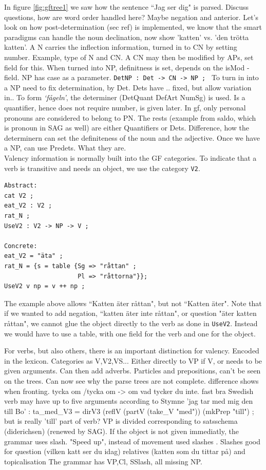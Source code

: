 \documentclass{report}
\begin{document}
In figure \ref{fig:gftree1} we saw how the sentence ``Jag ser dig" is parsed.
Discuss questions, how are word order handled here? Maybe negation and anterior.
Let's look on how post-determination (sec ref) is implemented, we know that the
smart paradigms can handle the noun declination, now show 'katten' vs. 'den trötta katten'.
A N carries the inflection information, turned in to CN by setting number. Example, type
of N and CN. A CN may then be modified by APs, set field for this. When turned into NP, 
definitness is set, depends on the isMod -field. NP has case as a parameter.
\verb|DetNP : Det -> CN -> NP ; |
To turn in into a NP need to fix determination, by Det. Dets have .. fixed,
but allow variation in.. 
To form \emph{`fågeln'}, the determiner (DetQuant DefArt NumSg) is used.
Is a quantifier, hence does not require number, is given later.
In gf, only personal pronouns are considered to belong to PN. The rests (example from
saldo, which is pronoun in SAG as well) are either Quantifiers or Dets.
Difference, how the determinern can set the definiteness of the noun and
the adjective.
Once we have a NP, can use Predets. What they are.\\

Valency information is normally built into the GF categories. To indicate that
a verb is transitive and needs an object, we use the category \verb_V2_.
\begin{verbatim}
Abstract:
cat V2 ; 
eat_V2 : V2 ;
rat_N ;
UseV2 : V2 -> NP -> V ;

Concrete:
eat_V2 = "äta" ;
rat_N = {s = table {Sg => "råttan" ;
                    Pl => "råttorna"}};
UseV2 v np = v ++ np ;
\end{verbatim}

The example above allows ``Katten äter råttan", but not ``Katten äter".
Note that if we wanted to add negation, ``katten äter inte råttan", or question
"äter katten råttan", we cannot glue the object directly to the verb as done in
\verb-UseV2-. Instead we would have to use a table, with one field for the verb
and one for the object. 


For verbs, but also others, there is an important distinction for valency.
Encoded in the lexicon. Categories as V,V2,VS...
Either directly to VP if V, or needs to be given arguments. Can then add adverbs.
Particles and prepositions, can't be seen on the trees. Can now see why the parse
trees are not complete. difference shows when fronting.
tycka om /tycka om -> om vad tycker du inte. fast bra
Swedish verb may have up to five arguments according to Stymne
'jag tar med mig den till Bo' : ta\_med\_V3 = dirV3 (reflV (partV (take\_V "med")) (mkPrep "till") ;
but is really 'till' part of verb?
VP is divided corresponding to satsschema (diderichsen) (renewed by SAG).
If the object is not given immediatly, the grammar uses slash.
"Speed up", instead of movement used slashes \cite{gazdar}.
Slashes good for question (vilken katt ser du idag)
relatives (katten som du tittar på) and topicalisation
The grammar has VP,Cl, SSlash, all missing NP.
\end{document}
